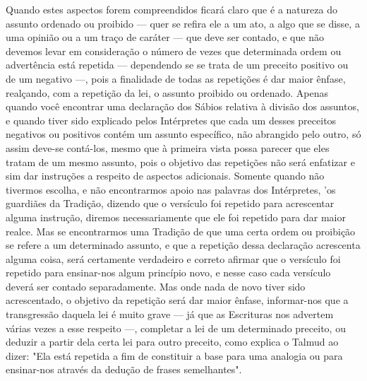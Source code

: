 Quando estes aspectos forem compreendidos ficará claro que é a na­tureza
do assunto ordenado ou proibido --- quer se refira ele a um ato, a algo
que se disse, a uma opinião ou a um traço de caráter --- que deve ser
contado, e que não devemos levar em consideração o número de vezes que
determina­da ordem ou advertência está repetida --- dependendo se se
trata de um precei­to positivo ou de um negativo ---, pois a finalidade
de todas as repetições é dar maior ênfase, realçando, com a repetição da
lei, o assunto proibido ou ordena­do. Apenas quando você encontrar uma
declaração dos Sábios relativa à divi­são dos assuntos, e quando tiver
sido explicado pelos Intérpretes que cada um desses preceitos negativos
ou positivos contém um assunto específico, não abrangido pelo outro, só
assim deve-se contá-los, mesmo que à primeira vista possa parecer que
eles tratam de um mesmo assunto, pois o objetivo das repe­tições não
será enfatizar e sim dar instruções a respeito de aspectos adicionais.
Somente quando não tivermos escolha, e não encontrarmos apoio nas
palavras dos Intérpretes, 'os guardiães da Tradição, dizendo que o
versículo foi repetido para acrescentar alguma instrução, diremos
necessariamente que ele foi repeti­do para dar maior realce. Mas se
encontrarmos uma Tradição de que uma certa ordem ou proibição se refere
a um determinado assunto, e que a repetição des­sa declaração acrescenta
alguma coisa, será certamente verdadeiro e correto afir­mar que o
versículo foi repetido para ensinar-nos algum princípio novo, e nes­se
caso cada versículo deverá ser contado separadamente. Mas onde nada de
novo tiver sido acrescentado, o objetivo da repetição será dar maior
ênfase, informar-nos que a transgressão daquela lei é muito grave --- já
que as Escritu­ras nos advertem várias vezes a esse respeito ---,
completar a lei de um determi­nado preceito, ou deduzir a partir dela
certa lei para outro preceito, como ex­plica o Talmud ao dizer: "Ela
está repetida a fim de constituir a base para uma analogia ou para
ensinar-nos através da dedução de frases semelhantes".

